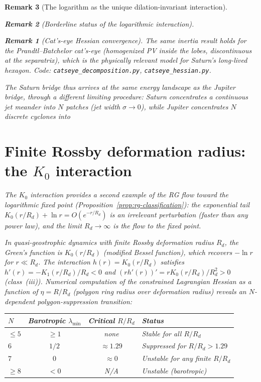 \documentclass[12pt, a4paper]{article}
\newtheorem{remark}{Remark}[section]
\numberwithin{equation}{section}
\begin{document}
\begin{remark}[The logarithm as the unique dilation-invariant interaction]
\begin{remark}[Borderline status of the logarithmic interaction]
\begin{remark}[Cat's-eye Hessian convergence]
\noindent
The same inertia result holds for the Prandtl--Batchelor cat's-eye
(homogenized PV inside the lobes, discontinuous at the separatrix),
which is the physically relevant model for Saturn's long-lived
hexagon.  Code:
\texttt{catseye\_decomposition.py},
\texttt{catseye\_hessian.py}.
\end{remark}

The Saturn bridge thus arrives at the \emph{same} energy landscape as
the Jupiter bridge, through a different limiting procedure: Saturn
concentrates a continuous jet meander into $N$ patches (jet width
$\sigma \to 0$), while Jupiter concentrates $N$ discrete cyclones into

\section{Finite Rossby deformation radius: the $K_0$ interaction}
\label{sec:k0-interaction}
\label{sec:deformation}

The $K_0$ interaction provides a second example of the RG flow
toward the logarithmic fixed point
(Proposition~\ref{prop:rg-classification}): the exponential tail
$K_0(r/R_d) + \ln r = O(e^{-r/R_d})$ is an irrelevant perturbation
(faster than any power law), and the limit $R_d \to \infty$ is the
flow to the fixed point.

In quasi-geostrophic dynamics with finite Rossby deformation radius
$R_d$, the Green's function is $K_0(r/R_d)$ (modified Bessel function),
which recovers $-\ln r$ for $r \ll R_d$.  The interaction $h(r) =
K_0(r/R_d)$ satisfies $h'(r) = -K_1(r/R_d)/R_d < 0$ and
$(rh'(r))' = rK_0(r/R_d)/R_d^2 > 0$ (class~(iii)).  Numerical
computation of the constrained Lagrangian Hessian as a function of
$\eta = R/R_d$ (polygon ring radius over deformation radius) reveals
an $N$-dependent \emph{polygon-suppression transition}:

\begin{center}
\begin{tabular}{lccl}
\toprule
$N$ & Barotropic $\lambda_{\min}$ & Critical $R/R_d$ & Status \\
\midrule
$\le 5$ & $\ge 1$ & none & Stable for all $R/R_d$ \\
$6$ & $1/2$ & $\approx 1.29$ & Suppressed for $R/R_d > 1.29$ \\
$7$ & $0$ & $\approx 0$ & Unstable for any finite $R/R_d$ \\
$\ge 8$ & $< 0$ & N/A & Unstable (barotropic) \\
\bottomrule
\end{tabular}
\end{center}


\end{remark}
\end{remark}
\end{document}
